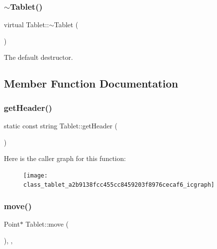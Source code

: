 \subsubsection{\texorpdfstring{$\sim$\+Tablet()}{~Tablet()}}
{\footnotesize\ttfamily virtual Tablet\+::$\sim$\+Tablet (\begin{DoxyParamCaption}{ }\end{DoxyParamCaption})\hspace{0.3cm}{\ttfamily [virtual]}}

The default destructor. 

\subsection{Member Function Documentation}
\mbox{\label{class_tablet_a2b9138fcc455cc8459203f8976cecaf6}} 
\subsubsection{\texorpdfstring{get\+Header()}{getHeader()}}
{\footnotesize\ttfamily static const string Tablet\+::get\+Header (\begin{DoxyParamCaption}{ }\end{DoxyParamCaption})\hspace{0.3cm}{\ttfamily [static]}}

Here is the caller graph for this function\+:
\nopagebreak
\begin{figure}[H]
\begin{center}
\leavevmode
\texttt{[image: class\_tablet\_a2b9138fcc455cc8459203f8976cecaf6\_icgraph]}
\end{center}
\end{figure}
\mbox{\label{class_tablet_ab1b8c7591be0c6ea118c8ab1c17839bb}} 
\subsubsection{\texorpdfstring{move()}{move()}}
{\footnotesize\ttfamily Point$\ast$ Tablet\+::move (\begin{DoxyParamCaption}{ }\end{DoxyParamCaption})\hspace{0.3cm}{\ttfamily [inline]}, {\ttfamily [override]}, {\ttfamily [virtual]}}

